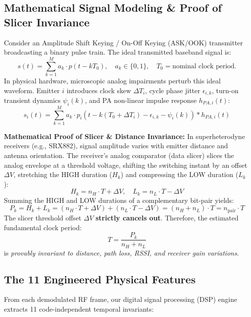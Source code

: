 \documentclass[11pt,a4paper]{article}
\begin{document}
\subsection{Mathematical Signal Modeling \& Proof of Slicer Invariance}
Consider an Amplitude Shift Keying / On-Off Keying (ASK/OOK) transmitter broadcasting a binary pulse train. The ideal transmitted baseband signal is:
\begin{equation}
s(t) = \sum_{k=1}^{M} a_k \cdot p(t - k T_0), \quad a_k \in \{0, 1\}, \quad T_0 = \text{nominal clock period.}
\end{equation}
In physical hardware, microscopic analog impairments perturb this ideal waveform. Emitter $i$ introduces clock skew $\Delta T_i$, cycle phase jitter $\epsilon_{i,k}$, turn-on transient dynamics $\psi_i(k)$, and PA non-linear impulse response $h_{PA,i}(t)$:
\begin{equation}
s_i(t) = \sum_{k=1}^{M} a_k \cdot p_i\left(t - k(T_0 + \Delta T_i) - \epsilon_{i,k} - \psi_i(k)\right) * h_{PA,i}(t)
\end{equation}

\noindent \textbf{Mathematical Proof of Slicer \& Distance Invariance:} In superheterodyne receivers (e.g., SRX882), signal amplitude varies with emitter distance and antenna orientation. The receiver's analog comparator (data slicer) slices the analog envelope at a threshold voltage, shifting the switching instant by an offset $\Delta V$, stretching the HIGH duration ($H_k$) and compressing the LOW duration ($L_k$):
\begin{equation}
H_k = n_H \cdot T + \Delta V, \quad L_k = n_L \cdot T - \Delta V
\end{equation}
Summing the HIGH and LOW durations of a complementary bit-pair yields:
\begin{equation}
P_k = H_k + L_k = (n_H \cdot T + \Delta V) + (n_L \cdot T - \Delta V) = (n_H + n_L) \cdot T = n_{\text{pair}} \cdot T
\end{equation}
The slicer threshold offset $\Delta V$ \textbf{strictly cancels out}. Therefore, the estimated fundamental clock period:
\begin{equation}
T = \frac{P_k}{n_H + n_L}
\end{equation}
is \textit{provably invariant to distance, path loss, RSSI, and receiver gain variations}.

\subsection{The 11 Engineered Physical Features}
From each demodulated RF frame, our digital signal processing (DSP) engine extracts 11 code-independent temporal invariants:
\end{document}
